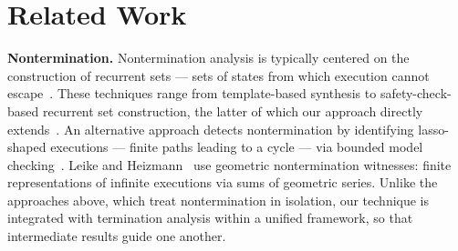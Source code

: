 \section{Related Work}
\label{Sec:Related}
\textbf{Nontermination.} 
Nontermination analysis is typically centered on the construction 
of recurrent sets — sets of states from which execution cannot 
escape~\cite{DBLP:conf/cade/FrohnG22,DBLP:conf/tacas/BrockschmidtCIK16,
DBLP:conf/tacas/ChenCFNO14,DBLP:conf/foveoos/BrockschmidtSOG11,
DBLP:conf/cav/LarrazNORR14,FedyukovichZG18}.
These techniques range from template-based synthesis to 
safety-check-based recurrent set construction, the latter of which 
our approach directly extends~\cite{DBLP:conf/tacas/ChenCFNO14}.
An alternative approach detects nontermination by identifying 
lasso-shaped executions — finite paths leading to a cycle — via 
bounded model checking~\cite{DBLP:journals/entcs/BiereAS02}.
Leike and Heizmann~\cite{DBLP:conf/tacas/LeikeH18} use 
geometric nontermination witnesses: finite representations of 
infinite executions via sums of geometric series.
Unlike the approaches above, which treat nontermination in isolation, 
our technique is integrated with termination analysis within a unified 
framework, so that intermediate results guide one another.


